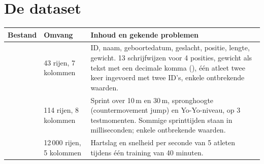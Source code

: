 \section{De dataset}

\noindent
{}
\begin{tabularx}{\textwidth}{@{}L{3.1cm}L{3.2cm}Y@{}}
\toprule
\textbf{Bestand} & \textbf{Omvang} & \textbf{Inhoud en gekende problemen} \\
\midrule
{}   & 43 rijen, 7 kolommen   & ID, naam, geboortedatum, geslacht, positie, lengte, gewicht. 13 schrijfwijzen voor 4 posities, gewicht als tekst met een decimale komma (), één atleet twee keer ingevoerd met twee ID's, enkele ontbrekende waarden. \\
      & 114 rijen, 8 kolommen  & Sprint over 10\,m en 30\,m, spronghoogte (countermovement jump) en Yo-Yo-niveau, op 3 testmomenten. Sommige sprinttijden staan in milliseconden; enkele ontbrekende waarden. \\
 & 12\,000 rijen, 5 kolommen & Hartslag en snelheid per seconde van 5 atleten tijdens één training van 40 minuten. \\
\bottomrule
\end{tabularx}

